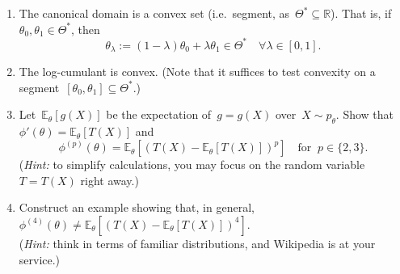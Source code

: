 \documentclass[11pt]{article}
\newcommand{\odima}[1]{{\color{red} #1}}
\newcommand{\R}{\mathds{R}}
\newcommand{\E}{\mathds{E}}
\newcommand{\cX}{\mathcal{X}}
\newcommand{\leqs}{\leqslant}
\newcommand{\geqs}{\geqslant}
\renewcommand{\le}{\leqs}
\renewcommand{\ge}{\geqs}
\begin{document}
\begin{enumerate}
\item The canonical domain is a convex set (i.e.~segment, as~$\Theta^* \subseteq \R$). That is, if~$\theta_0, \theta_1 \in \Theta^*$, then
\[
\theta_{\lambda} := (1-\lambda)\theta_0 + \lambda\theta_1 \in \Theta^* \quad \forall \lambda \in [0,1].
\]
\item The {log-cumulant} is convex. (Note that it suffices to test convexity on a segment~$[\theta_0, \theta_1] \subseteq \Theta^*$.)
\item Let~$\E_{\theta}[g(X)]$ be the expectation of~$g = g(X)$ over~$X \sim p_{\theta}$. Show that~$\phi'(\theta) = \E_{\theta}[T(X)]$ and
\[
\phi^{(p)}(\theta) = \E_{\theta}[(T(X) - \E_{\theta}[T(X)])^p] \quad \text{for}\;\; p \in \{2,3\}.
\] 
({\em Hint:} to simplify calculations, you may focus on the random variable~$T = T(X)$ right away.)
\item Construct an example showing that, in general,~$\phi^{(4)}(\theta) \ne \E_{\theta}[(T(X) - \E_{\theta}[T(X)])^4]$.\\
({\em Hint:} think in terms of familiar distributions, and Wikipedia is at your service.)



\end{enumerate}
\end{document}
